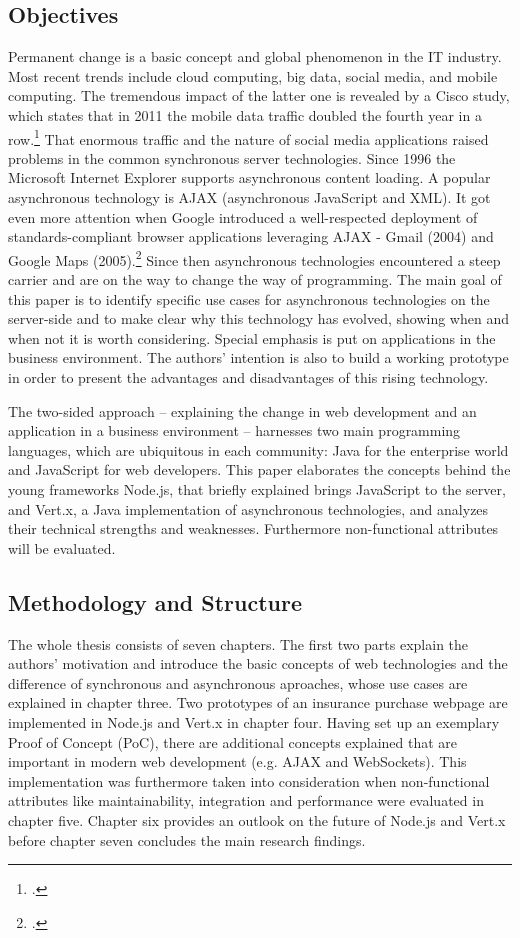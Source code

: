 \subsection{Objectives}
\label{sec:objectives}
Permanent change is a basic concept and global phenomenon in the IT industry. 
Most recent trends include cloud computing, big data, social media, and mobile computing.
The tremendous impact of the latter one is  revealed by a Cisco study, which states that in 2011 the mobile data traffic
doubled the fourth year in a row.\footcite[Cf.][]{cisco_2012} That enormous traffic and the
nature of social media applications raised problems in the common synchronous server technologies.
Since 1996 the Microsoft Internet Explorer supports asynchronous content loading. A popular
asynchronous technology is AJAX (asynchronous JavaScript and XML). It got even more attention when
Google introduced a well-respected deployment of standards-compliant browser applications leveraging AJAX - Gmail (2004) 
and Google Maps (2005).\footcite[Cf.][]{Swartz_2005} Since then asynchronous technologies
encountered a steep carrier and are on the way to change the way of programming.
The main goal of this paper is to identify specific use cases for asynchronous technologies on the server-side and to make clear why this technology has evolved, showing when and when not it is worth considering. Special emphasis is put on applications in the business environment. 
The authors' intention is also to build a working prototype in order to present the advantages and
disadvantages of this rising technology.

The two-sided approach – explaining the change in web development and an application in a 
business environment – harnesses two main programming languages, which are ubiquitous in each
community: Java for the enterprise world and JavaScript for web developers.
This paper elaborates the concepts behind the young frameworks Node.js, that briefly explained brings JavaScript to the server, and 
Vert.x, a Java implementation of asynchronous technologies, and analyzes their 
technical strengths and weaknesses. Furthermore non-functional attributes will be
evaluated.

\subsection{Methodology and Structure}
The whole thesis consists of seven chapters. The first two parts explain the authors' motivation and introduce the 
basic concepts of web technologies and the difference of synchronous and asynchronous aproaches, whose use cases are explained in chapter three.
Two prototypes of an insurance purchase webpage are implemented in Node.js and Vert.x in chapter four.
Having set up an exemplary Proof of Concept (PoC), there are additional concepts explained that are important in modern web development (e.g. AJAX and WebSockets). This implementation was furthermore taken into consideration when non-functional attributes like maintainability, integration and performance were evaluated in chapter five. Chapter six provides an outlook on the future of Node.js and Vert.x before chapter seven concludes the main research findings.

